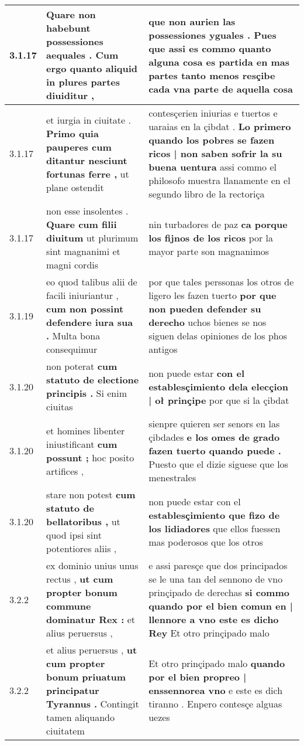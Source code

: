 \begin{tabular}{|p{1cm}|p{6.5cm}|p{6.5cm}|}
3.1.17 & Quare non habebunt possessiones aequales . \textbf{ Cum ergo quanto aliquid } in plures partes diuiditur , & que non aurien las possessiones yguales . \textbf{ Pues que assi es commo quanto alguna cosa es partida en mas partes } tanto menos resçibe cada vna parte de aquella cosa \\\hline
3.1.17 & et iurgia in ciuitate . \textbf{ Primo quia pauperes cum ditantur nesciunt fortunas ferre , } ut plane ostendit & contesçerien iniurias e tuertos e uaraias en la çibdat . \textbf{ Lo primero quando los pobres se fazen ricos | non saben sofrir la su buena uentura } assi commo el philosofo muestra llanamente en el segundo libro de la rectoriça \\\hline
3.1.17 & non esse insolentes . \textbf{ Quare cum filii diuitum } ut plurimum sint magnanimi et magni cordis & nin turbadores de paz \textbf{ ca porque los fijnos de los ricos } por la mayor parte son magnanimos \\\hline
3.1.19 & eo quod talibus alii de facili iniuriantur , \textbf{ cum non possint defendere iura sua . } Multa bona consequimur & por que tales perssonas los otros de ligero les fazen tuerto \textbf{ por que non pueden defender su derecho } uchos bienes se nos siguen delas opiniones de los phos antigos \\\hline
3.1.20 & non poterat \textbf{ cum statuto de electione principis . } Si enim ciuitas & non puede estar \textbf{ con el establesçimiento dela elecçion | oł prinçipe } por que si la çibdat \\\hline
3.1.20 & et homines libenter iniustificant \textbf{ cum possunt ; } hoc posito artifices , & sienpre quieren ser senors en las çibdades \textbf{ e los omes de grado fazen tuerto quando puede . } Puesto que el dizie siguese que los menestrales \\\hline
3.1.20 & stare non potest \textbf{ cum statuto de bellatoribus , } ut quod ipsi sint potentiores aliis , & non puede estar con el \textbf{ establesçimiento que fizo de los lidiadores } que ellos fuessen mas poderosos que los otros \\\hline
3.2.2 & ex dominio unius unus rectus , \textbf{ ut cum propter bonum commune dominatur Rex : } et alius peruersus , & e assi paresçe que dos principados se le una tan del sennono de vno prinçipado de derechas \textbf{ si commo quando por el bien comun en | llennore a vno este es dicho Rey } Et otro prinçipado malo \\\hline
3.2.2 & et alius peruersus , \textbf{ ut cum propter bonum priuatum principatur Tyrannus . } Contingit tamen aliquando ciuitatem & Et otro prinçipado malo \textbf{ quando por el bien propreo | enssennorea vno } e este es dich tiranno . Enpero contesçe alguas uezes \\\hline

\end{tabular}
